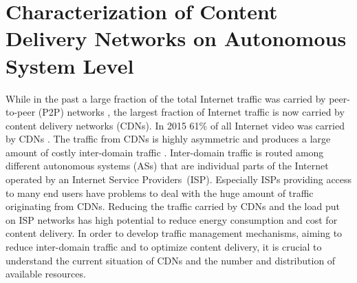 \chapter{Characterization of Content Delivery Networks on Autonomous System Level}\label{chap:aslevel}



While in the past a large fraction of the total Internet traffic was carried by peer-to-peer (P2P) networks \cite{Cisc09}, the largest fraction of Internet traffic is now carried by content delivery networks (CDNs).
In 2015 61\% of all Internet video was carried by CDNs \cite{cisco2016}.
The traffic from CDNs is highly asymmetric and produces a large amount of costly inter-domain traffic \cite{labovitz2010internet}.
Inter-domain traffic is routed among different autonomous systems (ASs) that are individual parts of the Internet operated by an Internet Service Providers~(ISP).
Especially ISPs providing access to many end users have problems to deal with the huge amount of traffic originating from CDNs.
Reducing the traffic carried by CDNs and the load put on ISP networks has high potential to reduce energy consumption and cost for content delivery.
In order to develop traffic management mechanisms, aiming to reduce inter-domain traffic and to optimize content delivery, it is crucial to understand the current situation of CDNs and the number and distribution of available resources.


